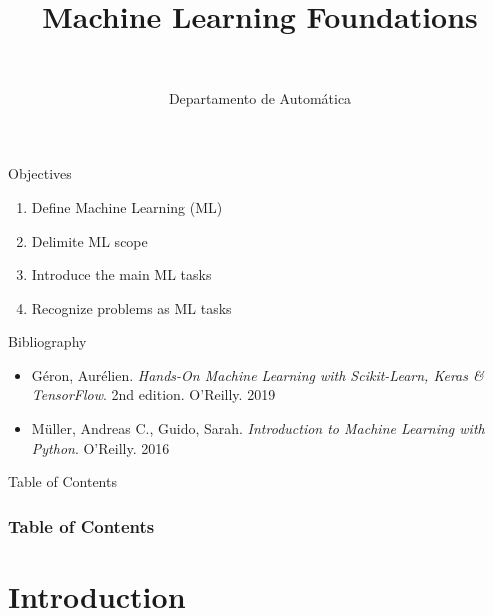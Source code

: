\documentclass[10pt,compress]{beamer} %
\title[Machine Learning Foundations]{Machine Learning Foundations}
\author{\asignatura\\\carrera}
\institute{}
\date{Departamento de Automática}
\begin{document}
{\titlepageBlue
    \begin{frame}
        \titlepage
    \end{frame}
}

\institute{\asignatura}

\begin{frame}[plain]{}
   \begin{block}{Objectives}
      \begin{enumerate}
         \item Define Machine Learning (ML)
		 \item Delimite ML scope
         \item Introduce the main ML tasks
         \item Recognize problems as ML tasks
      \end{enumerate} 
   \end{block}

   \begin{block}{Bibliography}
	\begin{itemize}
        \item G\'eron, Aur\'elien. \textit{Hands-On Machine Learning with Scikit-Learn, Keras \& TensorFlow}. 2nd edition. O'Reilly. 2019
        \item M\"uller, Andreas C., Guido, Sarah. \textit{Introduction to Machine Learning with Python}. O'Reilly. 2016
	\end{itemize}
   \end{block}
\end{frame}

{
\begin{frame}[shrink]{Table of Contents}

 	\frametitle{Table of Contents}
  	\begin{multicols}{2}
  		\tableofcontents
    \end{multicols}

\end{frame}
}

\section{Introduction}
\end{document}
